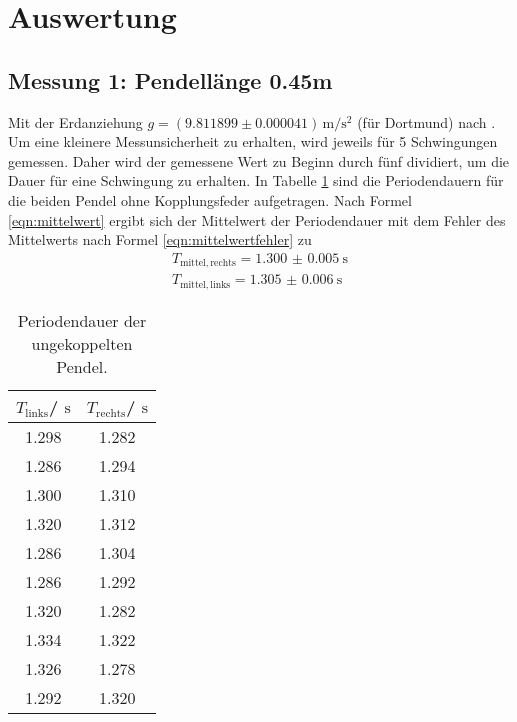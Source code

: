 \section{Auswertung}
\label{sec:Auswertung}
\FloatBarrier
\subsection{Messung 1: Pendellänge 0.45m}
Mit der Erdanziehung $g=(9.811899 \pm 0.000041) \,\si{\meter\per\square\second}$ (für Dortmund) nach \cite{G}.
Um eine kleinere Messunsicherheit zu erhalten, wird jeweils für 5 Schwingungen gemessen. Daher wird der gemessene Wert zu Beginn durch fünf dividiert, um die Dauer für eine Schwingung zu erhalten.
In Tabelle \ref{tab:alinksrechts} sind die Periodendauern für die beiden Pendel ohne Kopplungsfeder aufgetragen.
Nach Formel \eqref{eqn:mittelwert} ergibt sich der Mittelwert der Periodendauer mit dem Fehler des Mittelwerts nach Formel \eqref{eqn:mittelwertfehler} zu
\begin{gather*}
	T_{\mathrm{mittel, rechts}}=\SI{1.300(5)}{\second}\\
	T_{\mathrm{mittel, links}}=\SI{1.305(6)}{\second}
\end{gather*}
\begin{table}
	\centering
	\caption{Periodendauer der ungekoppelten Pendel.}
	\label{tab:alinksrechts}
	\begin{tabular}{cc}
		\toprule
		$T_{\mathrm{links}}$/ $\si{\second}$ & $T_{\mathrm{rechts}}$/ $\si{\second}$ \\
		\midrule
		1.298                                & 1.282                                 \\
		1.286                                & 1.294                                 \\
		1.300                                & 1.310                                 \\
		1.320                                & 1.312                                 \\
		1.286                                & 1.304                                 \\
		1.286                                & 1.292                                 \\
		1.320                                & 1.282                                 \\
		1.334                                & 1.322                                 \\
		1.326                                & 1.278                                 \\
		1.292                                & 1.320                                 \\
		\bottomrule
	\end{tabular}
\end{table}


